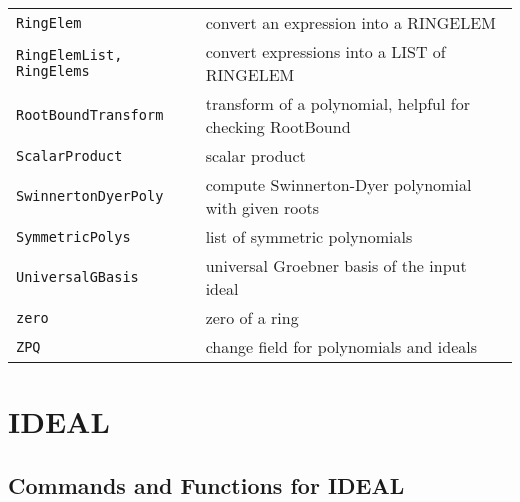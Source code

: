 \documentclass[a4paper]{mybook}
\begin{document}
\begin{center}
\begin{longtable}{ll}
{\verb~RingElem~} &
      convert an expression into a RINGELEM\\
   
{\verb~RingElemList, RingElems~} &
      convert expressions into a LIST of RINGELEM\\
   
{\verb~RootBoundTransform~} &
      transform of a polynomial, helpful for checking RootBound\\
   
{\verb~ScalarProduct~} &
      scalar product\\
   
{\verb~SwinnertonDyerPoly~} &
      compute Swinnerton-Dyer polynomial with given roots\\
   
{\verb~SymmetricPolys~} &
      list of symmetric polynomials\\
   
{\verb~UniversalGBasis~} &
      universal Groebner basis of the input ideal\\
   
{\verb~zero~} &
      zero of a ring\\
   
{\verb~ZPQ~} &
      change field for polynomials and ideals\\
   
\end{longtable}
\end{center}

\noindent



\chapter{IDEAL}
\label{IDEAL}

      

\section{Commands and Functions for IDEAL}
\label{Commands and Functions for IDEAL}

        
\end{document}
